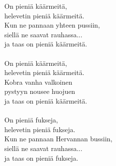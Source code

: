 
On pieniä käärmeitä, \\ helevetin pieniä käärmeitä. \\ Kun ne pannaan yhteen pussiin, \\ siellä ne saavat rauhassa... \\ ja taas on pieniä käärmeitä. \\ \hspace{10mm} \\ On pieniä käärmeitä, \\ helevetin pieniä käärmeitä. \\ Kobra vanha valkoinen \\ pystyyn nousee huojuen \\ ja taas on pieniä käärmeitä. \\ \hspace{10mm} \\ On pieniä fukseja, \\ helevetin pieniä fukseja. \\ Kun ne pannaan Hervannan bussiin, \\ siellä ne saavat rauhassa... \\ ja taas on pieniä fukseja.